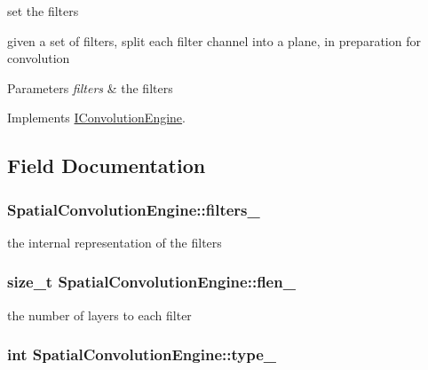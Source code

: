 set the filters 

given a set of filters, split each filter channel into a plane, in preparation for convolution


\begin{DoxyParams}{Parameters}
{\em filters} & the filters \\
\hline
\end{DoxyParams}


Implements \hyperlink{classIConvolutionEngine_a3570aae351b5fcb93bcd87a06c65ea0a}{I\-Convolution\-Engine}.



\subsection{Field Documentation}
\hypertarget{classSpatialConvolutionEngine_aec615ebfbedc8b7812481be1c2bcb1e5}{
\subsubsection[{filters\-\_\-}]{ Spatial\-Convolution\-Engine\-::filters\-\_\-\hspace{0.3cm}{\ttfamily [private]}}}\label{classSpatialConvolutionEngine_aec615ebfbedc8b7812481be1c2bcb1e5}


the internal representation of the filters 

\hypertarget{classSpatialConvolutionEngine_a5d58b30ec6846ef7ccf98f980d4fc957}{
\subsubsection[{flen\-\_\-}]{\setlength{\rightskip}{0pt plus 5cm}size\-\_\-t Spatial\-Convolution\-Engine\-::flen\-\_\-\hspace{0.3cm}{\ttfamily [private]}}}\label{classSpatialConvolutionEngine_a5d58b30ec6846ef7ccf98f980d4fc957}


the number of layers to each filter 

\hypertarget{classSpatialConvolutionEngine_a913adab567840b6d1b2407c3b22ca108}{
\subsubsection[{type\-\_\-}]{\setlength{\rightskip}{0pt plus 5cm}int Spatial\-Convolution\-Engine\-::type\-\_\-\hspace{0.3cm}{\ttfamily [private]}}}\label{classSpatialConvolutionEngine_a913adab567840b6d1b2407c3b22ca108}


